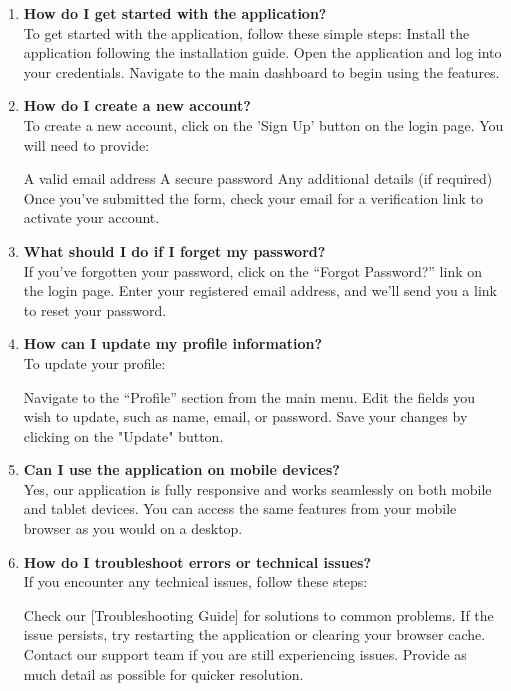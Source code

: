 \documentclass[12pt,a4paper]{report}
\begin{document}
\begin{enumerate}

    \item \textbf{How do I get started with the application?} \\
To get started with the application, follow these simple steps:
Install the application following the installation guide.
Open the application and log into your credentials.
Navigate to the main dashboard to begin using the features.

    \item \textbf{How do I create a new account?} \\
To create a new account, click on the 'Sign Up' button on the login page. You will need to provide:

A valid email address
A secure password
Any additional details (if required)
Once you’ve submitted the form, check your email for a verification link to activate your account.

    \item \textbf{What should I do if I forget my password?} \\
If you’ve forgotten your password, click on the “Forgot Password?” link on the login page. Enter your registered email address, and we’ll send you a link to reset your password.

    \item \textbf{How can I update my profile information?} \\
To update your profile:

Navigate to the “Profile” section from the main menu.
Edit the fields you wish to update, such as name, email, or password.
Save your changes by clicking on the "Update" button.

    \item \textbf{Can I use the application on mobile devices?} \\
Yes, our application is fully responsive and works seamlessly on both mobile and tablet devices. You can access the same features from your mobile browser as you would on a desktop.

    \item \textbf{How do I troubleshoot errors or technical issues?} \\
If you encounter any technical issues, follow these steps:

Check our [Troubleshooting Guide] for solutions to common problems.
If the issue persists, try restarting the application or clearing your browser cache.
Contact our support team if you are still experiencing issues. Provide as much detail as possible for quicker resolution.


\end{enumerate}
\end{document}
